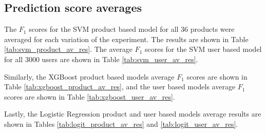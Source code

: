 \documentclass[review]{elsarticle}
\begin{document}
\subsection{Prediction score averages}
\label{av_res}

The \(F_{1}\) scores for the SVM product based model for all 36 products were averaged for each variation of the experiment. The results are shown in Table \ref{tab:svm_product_av_res}. The average \(F_{1}\) scores for the SVM user based model for all 3000 users are shown in Table \ref{tab:svm_user_av_res}.

Similarly, the XGBoost product based models average \(F_{1}\) scores are shown in Table \ref{tab:xgboost_product_av_res}, and the user based models average \(F_{1}\) scores are shown in Table \ref{tab:xgboost_user_av_res}.

Lastly, the Logistic Regression product and user based models average results are shown in Tables \ref{tab:logit_product_av_res} and \ref{tab:logit_user_av_res}.

\end{document}
